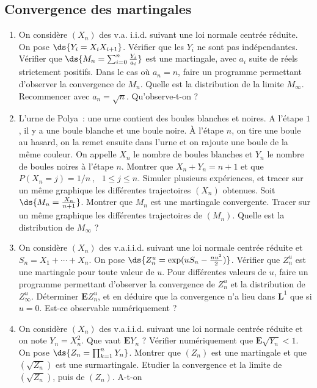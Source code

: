 {{%
\subsection{Convergence des martingales}
%

\begin{enumerate}
\item On considère $(X_n)$ des v.a. i.i.d. suivant une loi normale centrée 
  réduite. On pose $\ds{Y_i=X_iX_{i+1}}$. Vérifier que les $Y_i$ ne sont pas
  indépendantes. Vérifier que $\ds{M_n=\sum _{i=0}^n\frac{Y_i}{a_i}}$
  est une martingale, avec $a_i$ suite de réels strictement positifs. Dans le
  cas où $a_n=n$, faire un programme permettant d'observer la convergence de
  $M_n$. Quelle est la distribution de la limite $M_{\infty}$. Recommencer avec
  $a_n=\sqrt{n}$. Qu'observe-t-on ?
\item L'urne de Polya~: une urne contient des boules blanches et noires. A
  l'étape $1$, il y a une boule blanche et une boule noire. À l'étape $n$,
  on tire une boule au hasard, on la remet ensuite dans l'urne et on rajoute
  une boule de la même couleur. On appelle $X_n$ le nombre de boules
  blanches et $Y_n$ le nombre de boules noires à l'étape $n$. Montrer que
  $X_n + Y_n = n+1$ et que $P(X_n=j)=1/n \ , \ \ \ 1\leq j \leq n.$ Simuler
  plusieurs expériences, et tracer sur un même graphique les différentes
  trajectoires $(X_n)$ obtenues. Soit $\ds{M_n=\frac {X_n}{n+1}}$.
  Montrer que $M_n$ est une martingale convergente. Tracer sur un même
  graphique les différentes trajectoires de $(M_n)$. Quelle est la
  distribution de $M_{\infty}$ ?
\item On considère $(X_n)$ des v.a.i.i.d. suivant une loi normale centrée
  réduite et $S_n=X_1+\cdots+X_n$. On pose
  $\ds{Z_n^u=\exp(uS_n-\frac{nu^2}2)}$. Vérifier que $Z_n^u$ est une
  martingale pour toute valeur de $u$. Pour différentes valeurs de $u$, faire
  un programme permettant d'observer la convergence de $Z_n^u$ et la
  distribution de $Z_\infty^u$. Déterminer $\mathbf{E} Z_n^u$, et en déduire
  que la convergence n'a lieu dans $\mathbf{L}^1$ que si $u=0$. Est-ce
  observable numériquement ?
\item On considère $(X_n)$ des v.a.i.i.d. suivant une loi normale centrée
  réduite et on note $Y_n=X_n^2$. Que vaut $\mathbf{E} Y_n$ ? Vérifier
  numériquement que $\mathbf{E} \sqrt{Y_n}<1$. On pose
  $\ds{Z_n=\prod _{k=1}^n Y_n}$.  Montrer que $(Z_n)$ est une
  martingale et que $(\sqrt{Z_n})$ est une surmartingale. Etudier la
  convergence et la limite de $(\sqrt{Z_n})$, puis de $(Z_n)$. A-t-on

\end{enumerate}}}
